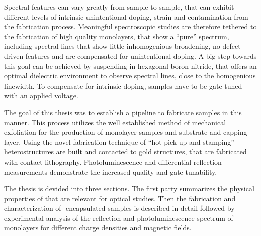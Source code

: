 Spectral features can vary greatly from sample to sample, that can exhibit different levels of intrinsic unintentional doping, strain and contamination from the fabrication process. Meaningful spectroscopic studies are therefore tethered to the fabrication of high quality monolayers, that show a ``pure'' spectrum, including spectral lines that show little inhomogenious broadening, no defect driven features and are compensated for unintentional doping. A big step towards this goal can be achieved by suspending \tmds in hexagonal boron nitride, that offers an optimal dielectric environment to observe spectral lines, close to the homogenious linewidth\cite{dean_boron_2010,cadiz_excitonic_2017}. To compensate for intrinsic doping, samples have to be gate tuned with an applied voltage.

The goal of this thesis was to establish a pipeline to fabricate samples in this manner. This process utilizes the well established method of mechanical exfoliation for the production of \tmdg monolayer samples and \hbn substrate and capping layer. Using the novel fabrication technique of ``hot pick-up and stamping'' \hbn-\tmdg heterostructures are built and contacted to gold structures, that are fabricated with contact lithography. Photoluminescence and differential reflection measurements demonstrate the increased quality and gate-tunability.

The thesis is devided into three sections. The first party summarizes the physical properties of \tmds that are relevant for optical studies. Then the fabrication and characterization of \hbn-encapsulated samples is described in detail followed by experimental analysis of the reflection and photoluminescence spectrum of \wse monolayers for different charge densities and magnetic fields.




